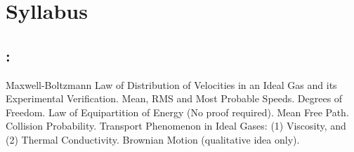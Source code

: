 \section*{Syllabus}

    \subsection*{\topicSubTitle: \topicTitle}
        Maxwell-Boltzmann Law of Distribution of Velocities in an Ideal Gas and its Experimental Verification. Mean, RMS and Most Probable Speeds. Degrees of Freedom. Law of Equipartition of Energy (No proof required). Mean Free Path. Collision Probability. Transport Phenomenon in Ideal Gases: (1) Viscosity, and (2) Thermal Conductivity. Brownian Motion (qualitative idea only).